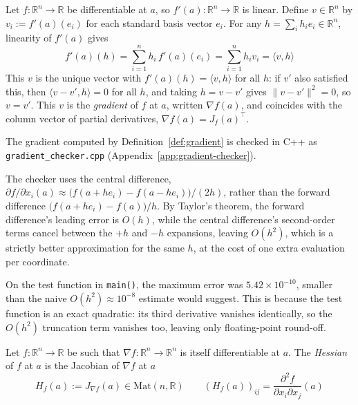		\begin{definition}[Gradient]
			\label{def:gradient}
			Let $f:\mathbb{R}^n\to\mathbb{R}$ be differentiable at $a$, so $f'(a):\mathbb{R}^n\to\mathbb{R}$ is linear. Define $v \in \mathbb{R}^n$ by $v_i := f'(a)(e_i)$ for each standard basis vector $e_i$. For any $h = \sum_i h_ie_i \in \mathbb{R}^n$, linearity of $f'(a)$ gives
			\[
				f'(a)(h) = \sum_{i=1}^n h_i\, f'(a)(e_i) = \sum_{i=1}^n h_iv_i = \langle v,h\rangle
			\]
			This $v$ is the unique vector with $f'(a)(h) = \langle v,h\rangle$ for all $h$: if $v'$ also satisfied this, then $\langle v-v',h\rangle=0$ for all $h$, and taking $h=v-v'$ gives $\|v-v'\|^2=0$, so $v=v'$. This $v$ is the \emph{gradient} of $f$ at $a$, written $\nabla f(a)$, and coincides with the column vector of partial derivatives, $\nabla f(a) = J_f(a)^\top$.
		\end{definition}
		
		\begin{compremark}
			The gradient computed by Definition~\ref{def:gradient} is checked in C++ as \texttt{gradient\_checker.cpp} (Appendix~\ref{app:gradient-checker}).
			
			The checker uses the central difference, $\partial f/\partial x_i(a) \approx \big(f(a+he_i)-f(a-he_i)\big)/(2h)$, rather than the forward difference $\big(f(a+he_i)-f(a)\big)/h$. By Taylor's theorem, the forward difference's leading error is $O(h)$, while the central difference's second-order terms cancel between the $+h$ and $-h$ expansions, leaving $O(h^2)$, which is a strictly better approximation for the same $h$, at the cost of one extra evaluation per coordinate.
			
			On the test function in \texttt{main()}, the maximum error was $5.42\times10^{-10}$, smaller than the naive $O(h^2)\approx10^{-8}$ estimate would suggest. This is because the test function is an exact quadratic: its third derivative vanishes identically, so the $O(h^2)$ truncation term vanishes too, leaving only floating-point round-off.
		\end{compremark}
		
		\begin{definition}
			\label{def:hessian}
			Let $f:\mathbb{R}^n\to\mathbb{R}$ be such that $\nabla f:\mathbb{R}^n\to\mathbb{R}^n$ is itself differentiable at $a$. The \emph{Hessian} of $f$ at $a$ is the Jacobian of $\nabla f$ at $a$
			\[
				H_f(a) := J_{\nabla f}(a) \in \mathrm{Mat}(n,\mathbb{R}) \qquad (H_f(a))_{ij} = \frac{\partial^2 f}{\partial x_i \partial x_j}(a)
			\]
		\end{definition}
		
